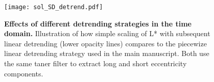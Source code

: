 \documentclass[draft]{agujournal2019}
\newcommand{\ijk}{\textcolor{blue}}
\begin{document}

\begin{figure}
  \centering \texttt{[image: sol\_SD\_detrend.pdf]}
  \caption{\label{fig:Lstar-detrend}
  \textbf{Effects of different detrending strategies in the time domain.}
    Illustration of how simple scaling of \gls{L*} with subsequent linear detrending (lower opacity lines)
    compares to the piecewize linear detrending strategy used in the main manuscript.
    Both use the same taner filter to extract long and short eccentricity components.
    }
\end{figure}
\end{document}
